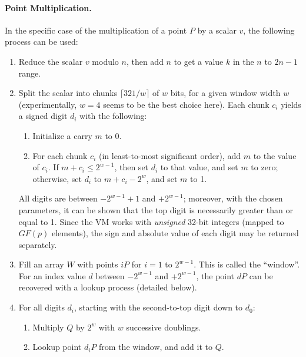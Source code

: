 \documentclass{llncs}
\newcommand{\GF}{GF}
\begin{document}
\paragraph{Point Multiplication.} In the specific case of the
multiplication of a point $P$ by a scalar $v$, the following process can
be used:
\begin{enumerate}

    \item Reduce the scalar $v$ modulo $n$, then add $n$ to get a value
    $k$ in the $n$ to $2n-1$ range.

    \item Split the scalar into chunks $\lceil 321/w \rceil$ of $w$ bits,
    for a given window width $w$ (experimentally, $w = 4$ seems to be
    the best choice here). Each chunk $c_i$ yields a signed digit $d_i$
    with the following:
    \begin{enumerate}

        \item Initialize a carry $m$ to 0.

        \item For each chunk $c_i$ (in least-to-most significant order),
        add $m$ to the value of $c_i$. If $m + c_i \leq 2^{w-1}$, then
        set $d_i$ to that value, and set $m$ to zero; otherwise, set
        $d_i$ to $m + c_i - 2^w$, and set $m$ to 1.

    \end{enumerate}
    All digits are between $-2^{w-1} + 1$ and $+2^{w - 1}$; moreover,
    with the chosen parameters, it can be shown that the top digit is
    necessarily greater than or equal to 1. Since the VM works with
    \emph{unsigned} 32-bit integers (mapped to $\GF(p)$ elements), the
    sign and absolute value of each digit may be returned separately.

    \item Fill an array $W$ with points $i P$ for $i = 1$ to $2^{w-1}$.
    This is called the ``window''. For an index value $d$ between $-2^{w-1}$
    and $+2^{w-1}$, the point $d P$ can be recovered with a lookup
    process (detailed below).

    \item For all digits $d_i$, starting with the second-to-top digit
    down to $d_0$:
    \begin{enumerate}

        \item Multiply $Q$ by $2^w$ with $w$ successive doublings.

        \item Lookup point $d_i P$ from the window, and add it to $Q$.

    \end{enumerate}

\end{enumerate}
\end{document}
